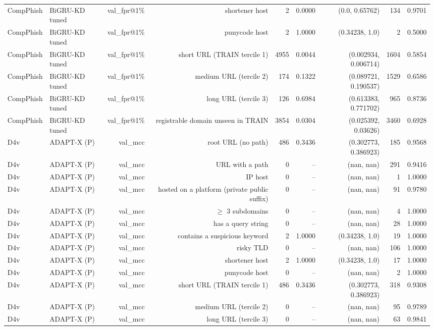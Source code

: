 \begin{table}[t]
\begin{tabular}{llrrrrrrr}
CompPhish & BiGRU-KD tuned & val\_fpr@1\% & shortener host & 2 & 0.0000 & (0.0, 0.65762) & 134 & 0.9701 \\
CompPhish & BiGRU-KD tuned & val\_fpr@1\% & punycode host & 2 & 1.0000 & (0.34238, 1.0) & 2 & 0.5000 \\
CompPhish & BiGRU-KD tuned & val\_fpr@1\% & short URL (TRAIN tercile 1) & 4955 & 0.0044 & (0.002934, 0.006714) & 1604 & 0.5854 \\
CompPhish & BiGRU-KD tuned & val\_fpr@1\% & medium URL (tercile 2) & 174 & 0.1322 & (0.089721, 0.190537) & 1529 & 0.6586 \\
CompPhish & BiGRU-KD tuned & val\_fpr@1\% & long URL (tercile 3) & 126 & 0.6984 & (0.613383, 0.771702) & 965 & 0.8736 \\
CompPhish & BiGRU-KD tuned & val\_fpr@1\% & registrable domain unseen in TRAIN & 3854 & 0.0304 & (0.025392, 0.03626) & 3460 & 0.6928 \\
D4v & ADAPT-X (P) & val\_mcc & root URL (no path) & 486 & 0.3436 & (0.302773, 0.386923) & 185 & 0.9568 \\
D4v & ADAPT-X (P) & val\_mcc & URL with a path & 0 & -- & (nan, nan) & 291 & 0.9416 \\
D4v & ADAPT-X (P) & val\_mcc & IP host & 0 & -- & (nan, nan) & 1 & 1.0000 \\
D4v & ADAPT-X (P) & val\_mcc & hosted on a platform (private public suffix) & 0 & -- & (nan, nan) & 91 & 0.9780 \\
D4v & ADAPT-X (P) & val\_mcc & $\geq$ 3 subdomains & 0 & -- & (nan, nan) & 4 & 1.0000 \\
D4v & ADAPT-X (P) & val\_mcc & has a query string & 0 & -- & (nan, nan) & 28 & 1.0000 \\
D4v & ADAPT-X (P) & val\_mcc & contains a suspicious keyword & 2 & 1.0000 & (0.34238, 1.0) & 19 & 1.0000 \\
D4v & ADAPT-X (P) & val\_mcc & risky TLD & 0 & -- & (nan, nan) & 106 & 1.0000 \\
D4v & ADAPT-X (P) & val\_mcc & shortener host & 2 & 1.0000 & (0.34238, 1.0) & 17 & 1.0000 \\
D4v & ADAPT-X (P) & val\_mcc & punycode host & 0 & -- & (nan, nan) & 2 & 1.0000 \\
D4v & ADAPT-X (P) & val\_mcc & short URL (TRAIN tercile 1) & 486 & 0.3436 & (0.302773, 0.386923) & 318 & 0.9308 \\
D4v & ADAPT-X (P) & val\_mcc & medium URL (tercile 2) & 0 & -- & (nan, nan) & 95 & 0.9789 \\
D4v & ADAPT-X (P) & val\_mcc & long URL (tercile 3) & 0 & -- & (nan, nan) & 63 & 0.9841 \\

\end{tabular}
\end{table}
